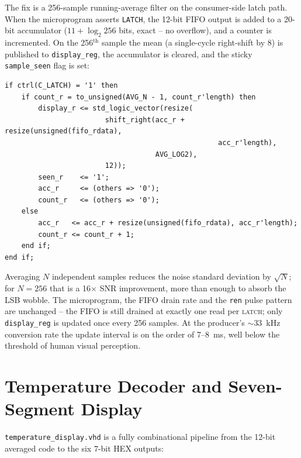 \documentclass[12pt,letterpaper]{article}
\begin{document}
The fix is a 256-sample running-average filter on the consumer-side latch
path.  When the microprogram asserts \texttt{LATCH}, the 12-bit FIFO output
is added to a 20-bit accumulator (\(11+\log_2 256\) bits, exact -- no
overflow), and a counter is incremented.  On the 256$^\text{th}$ sample the
mean (a single-cycle right-shift by 8) is published to \texttt{display\_reg},
the accumulator is cleared, and the sticky \texttt{sample\_seen} flag is set:

\begin{lstlisting}[caption={Averaging filter datapath (excerpt from \texttt{consumer\_fsm.vhd}).}]
if ctrl(C_LATCH) = '1' then
    if count_r = to_unsigned(AVG_N - 1, count_r'length) then
        display_r <= std_logic_vector(resize(
                        shift_right(acc_r + resize(unsigned(fifo_rdata),
                                                   acc_r'length),
                                    AVG_LOG2),
                        12));
        seen_r    <= '1';
        acc_r     <= (others => '0');
        count_r   <= (others => '0');
    else
        acc_r   <= acc_r + resize(unsigned(fifo_rdata), acc_r'length);
        count_r <= count_r + 1;
    end if;
end if;
\end{lstlisting}

Averaging \(N\) independent samples reduces the noise standard deviation by
\(\sqrt{N}\); for \(N=256\) that is a 16$\times$ SNR improvement, more than
enough to absorb the LSB wobble.  The microprogram, the FIFO drain rate and
the \texttt{ren} pulse pattern are unchanged -- the FIFO is still drained at
exactly one read per \textsc{latch}; only \texttt{display\_reg} is updated
once every 256 samples.  At the producer's $\sim$33~kHz conversion rate the
update interval is on the order of 7--8~ms, well below the threshold of
human visual perception.

\section{Temperature Decoder and Seven-Segment Display}
\label{sec:disp}

\texttt{temperature\_display.vhd} is a fully combinational pipeline from the
12-bit averaged code to the six 7-bit HEX outputs:
\end{document}

